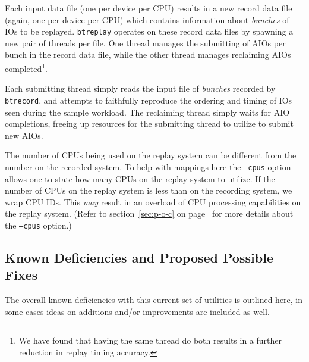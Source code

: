 \documentclass{article}
\begin{document}
Each input data file (one per device per CPU) results in a new record
data file (again, one per device per CPU) which contains information
about \emph{bunches} of IOs to be replayed. \texttt{btreplay} operates on
these record data files by spawning a new pair of threads per file. One
thread manages the submitting of AIOs per bunch in the record data file,
while the other thread manages reclaiming AIOs completed\footnote{We
have found that having the same thread do both results in a further
reduction in replay timing accuracy.}.

Each submitting thread simply reads the input file of \emph{bunches}
recorded by \texttt{btrecord}, and attempts to faithfully reproduce the
ordering and timing of IOs seen during the sample workload. The reclaiming
thread simply waits for AIO completions, freeing up resources for the
submitting thread to utilize to submit new AIOs.

The number of CPUs being used on the replay system can be different from
the number on the recorded system. To help with mappings here the
\texttt{--cpus} option allows one to state how many CPUs on the replay
system to utilize. If the number of CPUs on the replay system is less than
on the recording system, we wrap CPU IDs. This \emph{may} result in an
overload of CPU processing capabilities on the replay system. (Refer to
section~\ref{sec:p-o-c} on page~\pageref{sec:p-o-c} for more details about the
\texttt{--cpus} option.)

\newpage\subsection{Known Deficiencies and Proposed Possible Fixes}

The overall known deficiencies with this current set of utilities is
outlined here, in some cases ideas on additions and/or improvements are
included as well.
\end{document}
